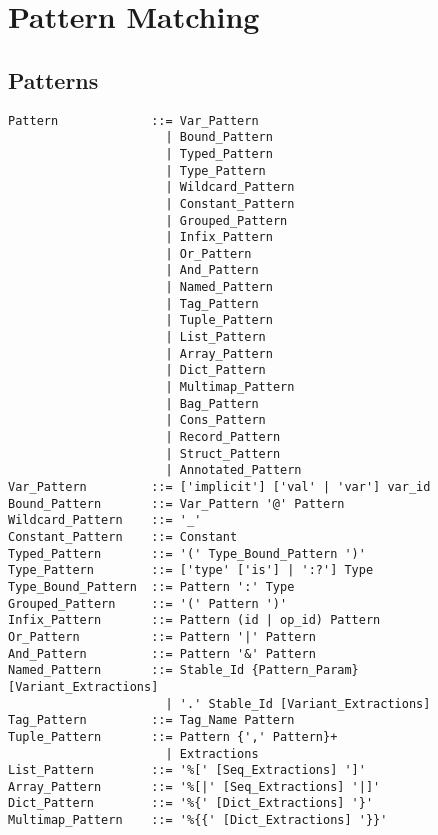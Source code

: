 
\chapter{Pattern Matching}
\label{sec:pattern-matching}

\minitoc

\newpage




\section{Patterns}
\label{sec:patterns}

\syntax\begin{lstlisting}[deletekeywords={as,with}]
Pattern             ::= Var_Pattern
                      | Bound_Pattern
                      | Typed_Pattern
                      | Type_Pattern
                      | Wildcard_Pattern
                      | Constant_Pattern
                      | Grouped_Pattern
                      | Infix_Pattern
                      | Or_Pattern
                      | And_Pattern
                      | Named_Pattern
                      | Tag_Pattern
                      | Tuple_Pattern
                      | List_Pattern
                      | Array_Pattern
                      | Dict_Pattern
                      | Multimap_Pattern
                      | Bag_Pattern
                      | Cons_Pattern
                      | Record_Pattern
                      | Struct_Pattern
                      | Annotated_Pattern
Var_Pattern         ::= ['implicit'] ['val' | 'var'] var_id
Bound_Pattern       ::= Var_Pattern '@' Pattern
Wildcard_Pattern    ::= '_'
Constant_Pattern    ::= Constant
Typed_Pattern       ::= '(' Type_Bound_Pattern ')'
Type_Pattern        ::= ['type' ['is'] | ':?'] Type
Type_Bound_Pattern  ::= Pattern ':' Type
Grouped_Pattern     ::= '(' Pattern ')'
Infix_Pattern       ::= Pattern (id | op_id) Pattern
Or_Pattern          ::= Pattern '|' Pattern
And_Pattern         ::= Pattern '&' Pattern
Named_Pattern       ::= Stable_Id {Pattern_Param} [Variant_Extractions]
                      | '.' Stable_Id [Variant_Extractions]
Tag_Pattern         ::= Tag_Name Pattern
Tuple_Pattern       ::= Pattern {',' Pattern}+
                      | Extractions
List_Pattern        ::= '%[' [Seq_Extractions] ']'
Array_Pattern       ::= '%[|' [Seq_Extractions] '|]'
Dict_Pattern        ::= '%{' [Dict_Extractions] '}'
Multimap_Pattern    ::= '%{{' [Dict_Extractions] '}}'

\end{lstlisting}
